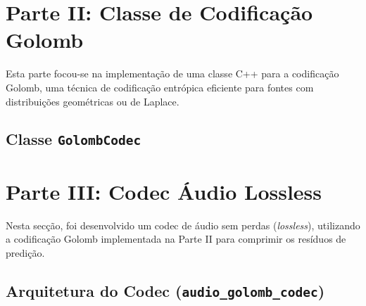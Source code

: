\documentclass[a4paper, 11pt, portuguese]{article}
\begin{document}
\section{Parte II: Classe de Codificação Golomb}

Esta parte focou-se na implementação de uma classe C++ para a codificação Golomb, uma técnica de codificação entrópica eficiente para fontes com distribuições geométricas ou de Laplace.

\subsection{Classe \texttt{GolombCodec}} %



\section{Parte III: Codec Áudio Lossless}

Nesta secção, foi desenvolvido um codec de áudio sem perdas (\textit{lossless}), utilizando a codificação Golomb implementada na Parte II para comprimir os resíduos de predição.

\subsection{Arquitetura do Codec (\texttt{audio\_golomb\_codec})}

\end{document}
